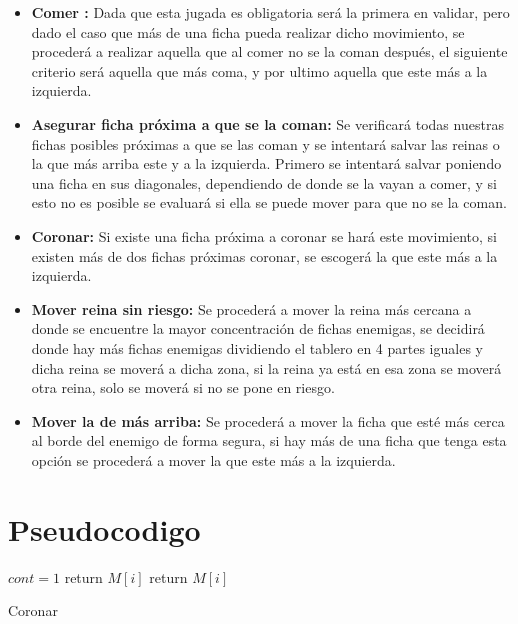 \documentclass[12pt]{article}
\begin{document}
    \begin{itemize}
        \item\textbf{Comer :} 
            Dada que esta jugada es obligatoria será la primera en validar, pero dado el caso que más de una ficha pueda realizar dicho movimiento, se procederá a realizar aquella que al comer no se la coman después, el siguiente criterio será aquella que más coma, y por ultimo aquella que este más a la izquierda.
        
        \item\textbf{Asegurar ficha próxima a que se la coman:}
            Se verificará todas nuestras fichas posibles próximas a que se las coman y se intentará salvar las reinas o la que más arriba este y a la izquierda. Primero se intentará salvar poniendo una ficha en sus diagonales, dependiendo de donde se la vayan a comer, y si esto no es posible se evaluará si ella se puede mover para que no se la coman.
            
        \item\textbf{Coronar:}
            Si existe una ficha próxima a coronar se hará este movimiento, si existen más de dos fichas próximas coronar, se escogerá la que este más a la izquierda.
        
        \item\textbf{Mover reina sin riesgo:}
            Se procederá a mover la reina más cercana a donde se encuentre la mayor concentración de fichas enemigas, se decidirá donde hay más fichas enemigas dividiendo el tablero en 4 partes iguales y dicha reina se moverá a dicha zona, si la reina ya está en esa zona se moverá otra reina, solo se moverá si no se pone en riesgo.
        
        \item\textbf{Mover la de más arriba:}
            Se procederá a mover la ficha que esté más cerca al borde del enemigo de forma segura, si hay más de una ficha que tenga esta opción se procederá a mover la que este más a la izquierda.
        
    \end{itemize}
    
\section{Pseudocodigo}



\begin{algorithm}[H]
  \begin{algorithmic}[1]
    \State $cont = 1$
                \State return $M[i]$
                \EndIf
                \EndIf
                \State return $M[i]$
            \EndIf
            \EndIf
        \EndFor
    \EndProcedure
    \end{algorithmic}
  \caption{Coronar}
\end{algorithm}
\end{document}
